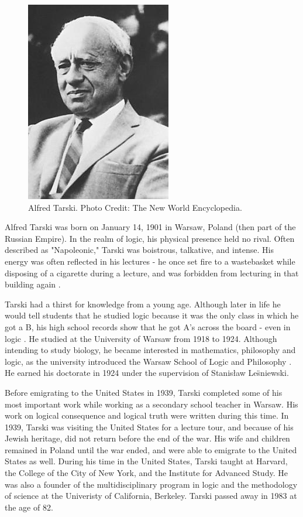 \documentclass[../../../include/open-logic-section]{subfiles}
\begin{document}
\begin{figure}[h!] 
\centering
\includegraphics[scale=1]{alfred-tarski.jpg} 
\caption{Alfred Tarski. Photo Credit: The New World Encyclopedia.}
 \end{figure}

Alfred Tarski was born on January 14, 1901 in Warsaw, Poland (then part of
the Russian Empire). In the realm of logic, his physical presence held no rival. 
Often
described as "Napoleonic," Tarski was boistrous, talkative, and intense.
His energy was often reflected in his lectures - he once set fire to a
wastebasket while disposing of a cigarette during a lecture, and was
forbidden from lecturing in that building again \citep[2]{feferman2004}.

Tarski had a thirst for knowledge from a young age. Although later in life
he would tell students that he studied logic because it was the only class
in which he got a B, his high school records show that he got A's across
the board - even in logic \citep[18]{feferman2004}. He studied at the
University of Warsaw from 1918 to 1924. Although intending to study
biology, he became interested in mathematics, philosophy and logic, as the
university introduced the Warsaw School of Logic and Philosophy
\cite[30]{feferman2004}. He earned his doctorate in 1924 under the
supervision of Stanisław Le\"{s}niewski.

Before emigrating to the United States in 1939, Tarski completed some of
his most important work while working as a secondary school teacher in
Warsaw. His work on logical consequence and logical truth were written
during this time. In 1939, Tarski was visiting the United States for a
lecture tour, and because of his Jewish heritage, did not return before the
end of the war. His wife and children remained in Poland until the war
ended, and were able to emigrate to the United States as well. During his
time in the United States, Tarski taught at Harvard, the College of the
City of New York, and the Institute for Advanced Study. He was also a
founder of the multidisciplinary program in logic and the methodology of
science at the Univeristy of California, Berkeley. Tarski passed away in
1983 at the age of 82.
\end{document}
